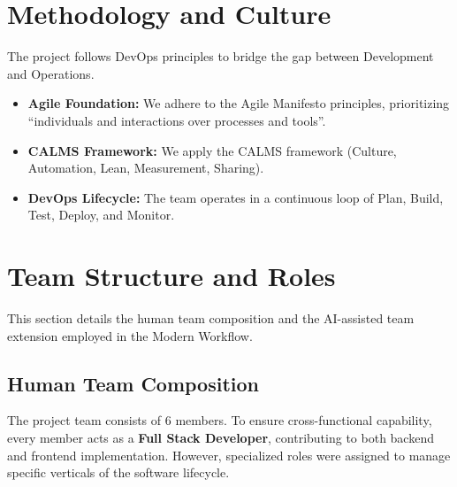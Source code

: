 \documentclass[a4paper,12pt]{report}
\begin{document}
\section{Methodology and Culture}
The project follows DevOps principles to bridge the gap between Development and Operations.
\begin{itemize}
    \item \textbf{Agile Foundation:} We adhere to the Agile Manifesto principles, prioritizing ``individuals and interactions over processes and tools''.
    \item \textbf{CALMS Framework:} We apply the CALMS framework (Culture, Automation, Lean, Measurement, Sharing).
    \item \textbf{DevOps Lifecycle:} The team operates in a continuous loop of Plan, Build, Test, Deploy, and Monitor.
\end{itemize}

\section{Team Structure and Roles}
This section details the human team composition and the AI-assisted team extension employed in the Modern Workflow.

\subsection{Human Team Composition}
The project team consists of 6 members. To ensure cross-functional capability, every member acts as a \textbf{Full Stack Developer}, contributing to both backend and frontend implementation. However, specialized roles were assigned to manage specific verticals of the software lifecycle.
\end{document}
